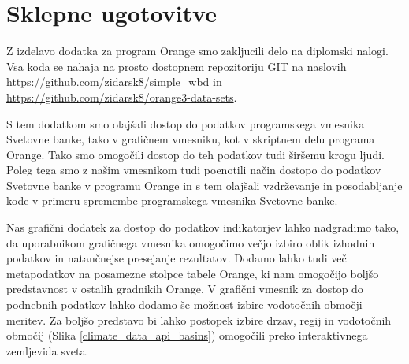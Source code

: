 \chapter{Sklepne ugotovitve}



Z izdelavo dodatka za program Orange smo zakljucili delo na diplomski nalogi.
Vsa koda se nahaja na prosto dostopnem repozitoriju GIT na naslovih
\url{https://github.com/zidarsk8/simple_wbd} in
\url{https://github.com/zidarsk8/orange3-data-sets}.




S tem dodatkom smo olajšali dostop do podatkov programskega vmesnika Svetovne 
banke, tako v grafičnem vmesniku, kot v skriptnem delu programa Orange. Tako
smo omogočili dostop do teh podatkov tudi širšemu krogu ljudi. Poleg tega
smo z našim vmesnikom tudi poenotili način dostopo do podatkov Svetovne banke
v programu Orange in s tem olajšali vzdrževanje in posodabljanje kode v
primeru spremembe programskega vmesnika Svetovne banke.



Nas grafični dodatek za dostop do podatkov indikatorjev lahko nadgradimo tako,
da uporabnikom grafičnega vmesnika omogočimo večjo izbiro oblik izhodnih
podatkov in natančnejse presejanje rezultatov. Dodamo lahko tudi več
metapodatkov na posamezne stolpce tabele Orange, ki nam omogočijo boljšo
predstavnost v ostalih gradnikih Orange. V grafični vmesnik za dostop do
podnebnih podatkov lahko dodamo še možnost izbire vodotočnih območji meritev.
Za boljšo predstavo bi lahko postopek izbire drzav, regij in vodotočnih
območij (Slika \ref{climate_data_api_basins}) omogočili preko interaktivnega 
zemljevida sveta.

% 
% 
